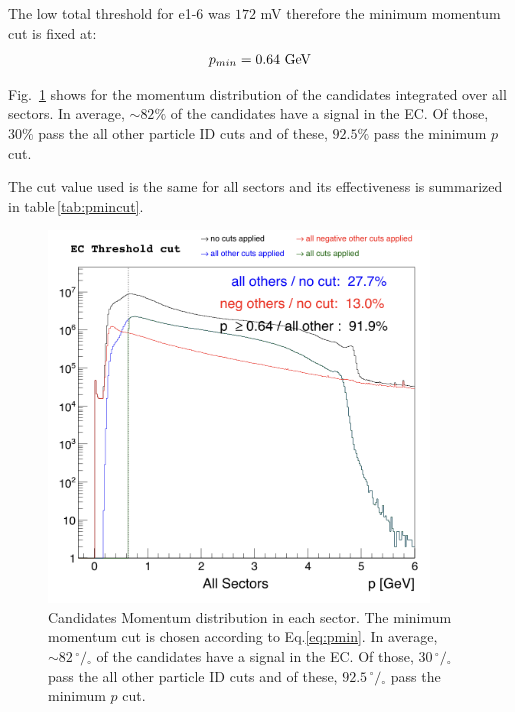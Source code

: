 The low total threshold for e1-6 was $172$ mV therefore the minimum momentum cut is fixed at:
$$
p_{min} = 0.64\,\,{\rm GeV}
$$

Fig.~\ref{fig:pmincut_alls} shows for the momentum distribution of the candidates integrated
over all sectors. In average, $\sim 82\%$ of the candidates 
have a signal in the EC. Of those, $30\%$ pass the all other particle ID
cuts and of these, $92.5\%$ pass the minimum $p$ cut.

The cut value used is the same for all sectors and its effectiveness is summarized in 
table\,\ref{tab:pmincut}.


\begin{figure}[h]
  \centering
		\includegraphics[width=0.9\textwidth]{img/cut-04pthr_sector-all.png}
		\caption{Candidates Momentum distribution in each sector. The minimum momentum cut is
               chosen according to Eq.\ref{eq:pmin}. In average, $\sim 82 \,^{\circ\!\!}/\!_\circ$ 
					of the candidates have a signal in the EC. Of those, $30 \,^{\circ\!\!}/\!_\circ$
					pass the all other particle ID cuts and of these, $92.5 \,^{\circ\!\!}/\!_\circ$
					pass the minimum $p$ cut.}
 		\label{fig:pmincut_alls}
\end{figure}

\clearpage



